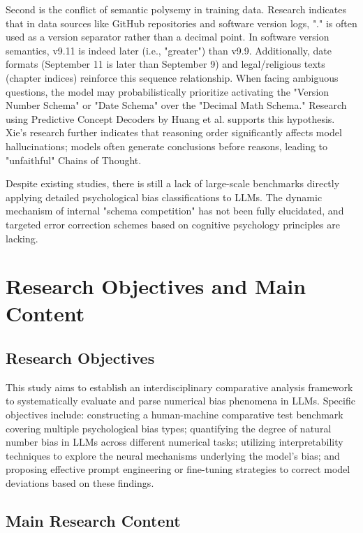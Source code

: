 Second is the conflict of semantic polysemy in training data. Research indicates that in data sources like GitHub repositories and software version logs, "." is often used as a version separator rather than a decimal point. In software version semantics, v9.11 is indeed later (i.e., "greater") than v9.9. Additionally, date formats (September 11 is later than September 9) and legal/religious texts (chapter indices) reinforce this sequence relationship. When facing ambiguous questions, the model may probabilistically prioritize activating the "Version Number Schema" or "Date Schema" over the "Decimal Math Schema." Research using Predictive Concept Decoders by Huang et al. supports this hypothesis\cite{huang2025}. Xie's research further indicates that reasoning order significantly affects model hallucinations; models often generate conclusions before reasons, leading to "unfaithful" Chains of Thought\cite{xie2025}.

Despite existing studies, there is still a lack of large-scale benchmarks directly applying detailed psychological bias classifications to LLMs. The dynamic mechanism of internal "schema competition" has not been fully elucidated, and targeted error correction schemes based on cognitive psychology principles are lacking.

\section{Research Objectives and Main Content}

\subsection{Research Objectives}

This study aims to establish an interdisciplinary comparative analysis framework to systematically evaluate and parse numerical bias phenomena in LLMs. Specific objectives include: constructing a human-machine comparative test benchmark covering multiple psychological bias types; quantifying the degree of natural number bias in LLMs across different numerical tasks; utilizing interpretability techniques to explore the neural mechanisms underlying the model's bias; and proposing effective prompt engineering or fine-tuning strategies to correct model deviations based on these findings.

\subsection{Main Research Content}

